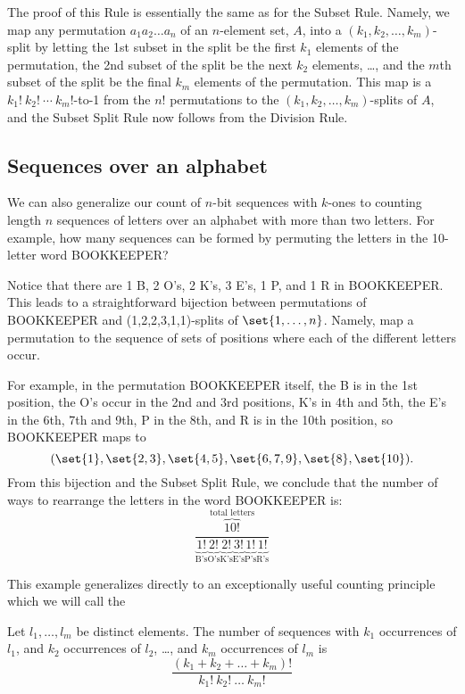 The proof of this Rule is essentially the same as for the Subset Rule.
Namely, we map any permutation $a_1a_2\dots a_n$ of an $n$-element set,
$A$, into a $(k_1,k_2, \dots, k_m)$-split by letting the 1st subset in the
split be the first $k_1$ elements of the permutation, the 2nd subset of
the split be the next $k_2$ elements, \dots, and the $m$th subset of the
split be the final $k_m$ elements of the permutation.  This map is a
$k_1!\ k_2!\ \cdots\ k_m!$-to-1 from the $n!$ permutations to the
$(k_1,k_2, \dots, k_m)$-splits of $A$, and the Subset Split Rule now
follows from the Division Rule.

\subsection{Sequences over an alphabet}

We can also generalize our count of $n$-bit sequences with $k$-ones to
counting length $n$ sequences of letters over an alphabet with more than
two letters.  For example, how many sequences can be formed by permuting
the letters in the 10-letter word BOOKKEEPER?

Notice that there are 1 B, 2 O's, 2 K's, 3 E's, 1 P, and 1 R in
BOOKKEEPER.  This leads to a straightforward bijection between
permutations of BOOKKEEPER and (1,2,2,3,1,1)-splits of $\set{1,\dots,n}$.
Namely, map a permutation to the sequence of sets of positions where each
of the different letters occur.

For example, in the permutation BOOKKEEPER itself, the B is in the 1st
position, the O's occur in the 2nd and 3rd positions, K's in 4th and 5th,
the E's in the 6th, 7th and 9th, P in the 8th, and R is in the 10th
position, so BOOKKEEPER maps to
\[
(\set{1}, \set{2,3}, \set{4,5}, \set{6,7,9}, \set{8}, \set{10}).
\]
From this bijection and the Subset Split Rule, we conclude that the
number of ways to rearrange the letters in the word BOOKKEEPER is:
\[
\frac{\overbrace{10!}^{\text{total letters}}}{
\underbrace{1!}_{\text{B's}}
\underbrace{2!}_{\text{O's}}
\underbrace{2!}_{\text{K's}}
\underbrace{3!}_{\text{E's}}
\underbrace{1!}_{\text{P's}}
\underbrace{1!}_{\text{R's}}}
\]

This example generalizes directly to an exceptionally useful counting
principle which we will call the
\begin{mathrule}
Let $l_1, \ldots, l_m$ be distinct elements.  The number of sequences with
$k_1$ occurrences of $l_1$, and $k_2$ occurrences of $l_2$, \dots, and
$k_m$ occurrences of $l_m$ is
\[
\frac{(k_1 + k_2 + \ldots + k_m)!}{k_1!\ k_2!\ \ldots\ k_m!}
\]
\end{mathrule}

